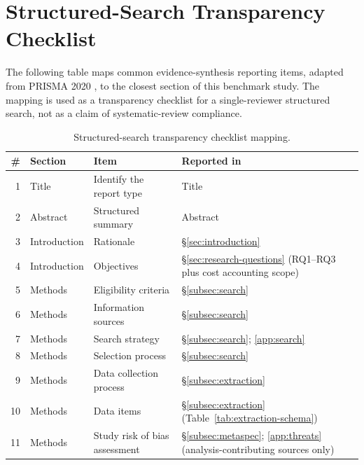 \section{Structured-Search Transparency Checklist}\label{app:prisma}

The following table maps common evidence-synthesis reporting items, adapted
from PRISMA 2020 \citep{page2021prisma}, to the closest section of this
benchmark study.  The mapping is used as a transparency checklist for a
single-reviewer structured search, not as a claim of systematic-review
compliance.

\begin{table}[htbp]
\centering
\caption{Structured-search transparency checklist mapping.}\label{tab:prisma-checklist}
\footnotesize
\begin{tabular}{rllp{5.8cm}}
\toprule
\# & Section & Item & Reported in \\
\midrule
1  & Title        & Identify the report type                         & Title \\
2  & Abstract     & Structured summary                                & Abstract \\
3  & Introduction & Rationale                                         & \S\ref{sec:introduction} \\
4  & Introduction & Objectives                                        & \S\ref{sec:research-questions} (RQ1--RQ3 plus cost accounting scope) \\
5  & Methods      & Eligibility criteria                              & \S\ref{subsec:search} \\
6  & Methods      & Information sources                               & \S\ref{subsec:search} \\
7  & Methods      & Search strategy                                   & \S\ref{subsec:search}; \ref{app:search} \\
8  & Methods      & Selection process                                 & \S\ref{subsec:search} \\
9  & Methods      & Data collection process                           & \S\ref{subsec:extraction} \\
10 & Methods      & Data items                                        & \S\ref{subsec:extraction} (Table~\ref{tab:extraction-schema}) \\
11 & Methods      & Study risk of bias assessment                     & \S\ref{subsec:metaspec}; \ref{app:threats} (analysis-contributing sources only) \\

\end{tabular}
\end{table}

